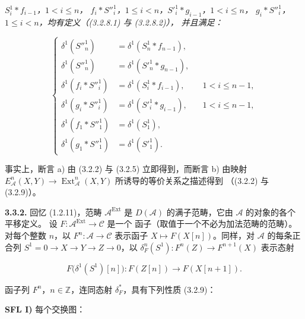 \clearpage
{}%
\begingroup\small\setlength{\parskip}{0pt}\setlength{\emergencystretch}{1.5em}
\setlength{\abovedisplayskip}{4pt plus 2pt minus 2pt}%
\setlength{\belowdisplayskip}{4pt plus 2pt minus 2pt}%

\noindent\textit{$S_i^1*f_{i-1}$，$1<i\leq n$，
$f_i*{S''}_i^1$，$1\leq i<n$，${S'}_i^1*g_{i-1}$，$1<i\leq n$，
$g_i*{S''}_i^1$，$1\leq i<n$，均有定义（(3.2.8.1) 与 (3.2.8.2)），
并且满足：}

\begin{equation}
\left\{
\begin{aligned}
\delta^1({S''}_n^1)
  &=\delta^1(S_n^1*f_{n-1}),\\
\delta^1({S''}_n^1)
  &=\delta^1({S'}_n^1*g_{n-1}),\\
\delta^1(f_i*{S''}_i^1)
  &=\delta^1(S_i^1*f_{i-1}),&&1<i\leq n-1,\\
\delta^1(g_i*{S''}_i^1)
  &=\delta^1({S'}_i^1*g_{i-1}),&&1<i\leq n-1,\\
\delta^1(f_1*{S''}_1^1)
  &=\delta^1(S_1^1),\\
\delta^1(g_1*{S''}_1^1)
  &=\delta^1({S'}_1^1).
\end{aligned}
\right.
\tag{3.3.1.2}
\end{equation}

事实上，断言 a) 由 (3.2.2) 与 (3.2.5) 立即得到，而断言 b) 由映射
$E_{\mathcal A}^{n}(X,Y)\longrightarrow
\operatorname{Ext}_{\mathcal A}^{n}(X,Y)$ 所诱导的等价关系之描述得到
（(3.2.2) 与 (3.2.9)）。

\medskip\noindent\textbf{3.3.2.}\quad
回忆 (1.2.11)，范畴 $\mathcal A^{\operatorname{Ext}}$ 是
$D(\mathcal A)$ 的满子范畴，它由 $\mathcal A$ 的对象的各个平移定义。
设 $F\colon\mathcal A^{\operatorname{Ext}}\longrightarrow\mathcal C$ 是一个
函子（取值于一个不必为加法范畴的范畴）。对每个整数 $n$，以
$F^n\colon\mathcal A\longrightarrow\mathcal C$ 表示函子
$X\longmapsto F(X[n])$。同样，对 $\mathcal A$ 的每条正合列
$S^1=0\longrightarrow X\longrightarrow Y\longrightarrow Z
\longrightarrow0$，以
$\delta_F^n(S^1)\colon F^n(Z)\longrightarrow F^{n+1}(X)$ 表示态射

\[
F\bigl(\delta^1(S^1)[n]\bigr)
\colon F(Z[n])\longrightarrow F(X[n+1]).
\]

函子列 $F^n$，$n\in\mathbb Z$，连同态射 $\delta_F^\ast$，具有下列性质
(3.2.9)：

\noindent\textbf{SFL I)} 每个交换图：

\begin{center}
\end{center}
\endgroup

